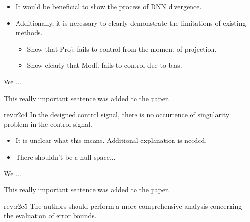\documentclass[12pt,english]{reviewresponse}
\begin{document}
\begin{howtoanswer}
    \begin{itemize}
        \item It would be beneficial to show the process of DNN divergence.
        \item Additionally, it is necessary to clearly demonstrate the limitations of existing methods.
        \begin{itemize}
            \item Show that Proj. fails to control from the moment of projection.
            \item Show clearly that Modf. fails to control due to bias.
        \end{itemize}
    \end{itemize}
\end{howtoanswer}

\begin{revresponse}
    We ...
    \begin{changes}
        This really important sentence was added to the paper.
    \end{changes}
\end{revresponse}

\begin{revcomment}[2]{rev:r2c4}
    In the designed control signal, there is no occurrence of singularity problem in the control signal.
\end{revcomment}

\begin{howtoanswer}
    \begin{itemize}
        \item It is unclear what this means. Additional explanation is needed.
        \item There shouldn't be a null space...
    \end{itemize}
\end{howtoanswer}

\begin{revresponse}
    We ...
    \begin{changes}
        This really important sentence was added to the paper.
    \end{changes}
\end{revresponse}

\begin{revcomment}[2]{rev:r2c5}
    The authors should perform a more comprehensive analysis concerning the evaluation of error bounds.
\end{revcomment}
\end{document}
